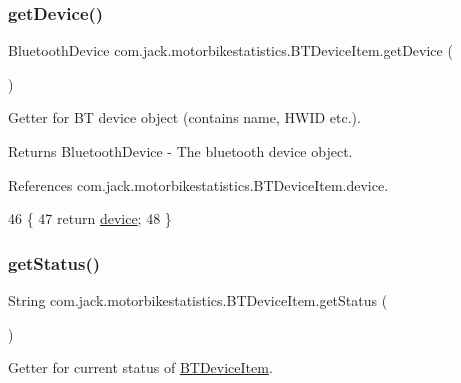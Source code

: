 \subsubsection{\texorpdfstring{get\+Device()}{getDevice()}}
{\footnotesize\ttfamily Bluetooth\+Device com.\+jack.\+motorbikestatistics.\+B\+T\+Device\+Item.\+get\+Device (\begin{DoxyParamCaption}{ }\end{DoxyParamCaption})\hspace{0.3cm}{\ttfamily [inline]}}



Getter for BT device object (contains name, H\+W\+ID etc.). 

\begin{DoxyReturn}{Returns}
Bluetooth\+Device -\/ The bluetooth device object. 
\end{DoxyReturn}


References com.\+jack.\+motorbikestatistics.\+B\+T\+Device\+Item.\+device.


\begin{DoxyCode}
46                                        \{
47         \textcolor{keywordflow}{return} \hyperlink{classcom_1_1jack_1_1motorbikestatistics_1_1_b_t_device_item_acd943b008d77dcb5d72f8a65fa4986b9}{device};
48     \}
\end{DoxyCode}
\mbox{\label{classcom_1_1jack_1_1motorbikestatistics_1_1_b_t_device_item_aee33189f94c2a428ac67301b536dd004}} 
\subsubsection{\texorpdfstring{get\+Status()}{getStatus()}}
{\footnotesize\ttfamily String com.\+jack.\+motorbikestatistics.\+B\+T\+Device\+Item.\+get\+Status (\begin{DoxyParamCaption}{ }\end{DoxyParamCaption})\hspace{0.3cm}{\ttfamily [inline]}}



Getter for current status of \hyperlink{classcom_1_1jack_1_1motorbikestatistics_1_1_b_t_device_item}{B\+T\+Device\+Item}. 

